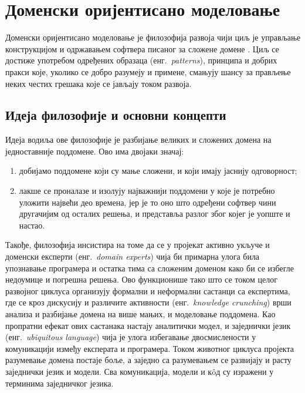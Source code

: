 \documentclass[12pt,oneside]{memoir}
\begin{document}
\chapter{Доменски оријентисано моделовање}\label{domenskiorijentisanomodelovanje}
Доменски оријентисано моделовање је филозофија развоја чији циљ је управљање конструкцијом и одржавањем софтвера писаног за сложене домене \cite{DomainDrivenDessign}. Циљ се достиже употребом одређених образаца (енг.~\textit{patterns}), принципа и добрих пракси које, уколико се добро разумеју и примене, смањују шансу за прављење неких честих грешака које се јављају током развоја.

\section{Идеја филозофије и основни концепти}
Идеја водиља ове филозофије је разбијање великих и сложених домена на једноставније поддомене. Ово има двојаки значај:
\begin{enumerate}
\item добијамо поддомене који су мање сложени, и који имају јаснију одговорност;
\item лакше се проналазе и изолују најважнији поддомени у које је потребно уложити највећи део времена, јер је то оно што одређени софтвер чини другачијим од осталих решења, и представља разлог због којег је уопште и настао.
\end{enumerate}

Такође, филозофија инсистира на томе да се у пројекат активно укључе и доменски експерти (енг.~\textit{domain experts}) чија би примарна улога била упознавање програмера и остатка тима са сложеним доменом како би се избегле недоумице и погрешна решења. Ово функционише тако што се током целог развојног циклуса организују формални и неформални састанци са експертима, где се кроз дискусију и различите активности (енг.~\textit{knowledge crunching}) врши анализа и разбијање домена на више мањих, и моделовање поддомена. Као пропратни ефекат ових састанака настају аналитички модел, и заједнички језик (енг.~\textit{ubiquitous language}) чија је улога избегавање двосмислености у комуникацији између експерата и програмера. Током животног циклуса пројекта разумевање домена постаје боље, а заједно са разумевањем се развијају и расту заједнички језик и модели. Сва комуникација, модели и кôд су изражени у терминима заједничког језика.
\end{document}

